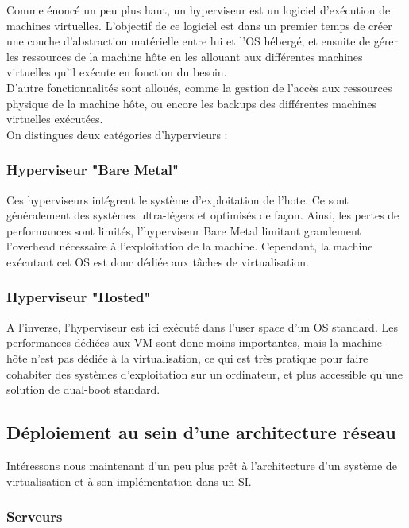Comme énoncé un peu plus haut, un hyperviseur est un logiciel d'exécution de machines virtuelles. L'objectif de ce logiciel est dans un premier temps de créer une couche d'abstraction matérielle entre lui et l'OS hébergé, et ensuite de gérer les ressources de la machine hôte en les allouant aux différentes machines virtuelles qu'il exécute en fonction du besoin.\\
D'autre fonctionnalités sont alloués, comme la gestion de l'accès aux ressources physique de la machine hôte, ou encore les backups des différentes machines virtuelles exécutées.\\
On distingues deux catégories d'hypervieurs :\\

\subsubsection{Hyperviseur "Bare Metal"}

Ces hyperviseurs intégrent le système d'exploitation de l'hote. Ce sont généralement des systèmes ultra-légers et optimisés de façon. Ainsi, les pertes de performances sont limités, l'hyperviseur Bare Metal limitant grandement l'overhead nécessaire à l'exploitation de la machine. Cependant, la machine exécutant cet OS est donc dédiée aux tâches de virtualisation.

\subsubsection{Hyperviseur "Hosted"}

A l'inverse, l'hyperviseur est ici exécuté dans l'user space d'un OS standard. Les performances dédiées aux VM sont donc moins importantes, mais la machine hôte n'est pas dédiée à la virtualisation, ce qui est très pratique pour faire cohabiter des systèmes d'exploitation sur un ordinateur, et plus accessible qu'une solution de dual-boot standard.

\subsection{Déploiement au sein d'une architecture réseau}

Intéressons nous maintenant d'un peu plus prêt à l'architecture d'un système de virtualisation et à son implémentation dans un SI.

\subsubsection{Serveurs}

